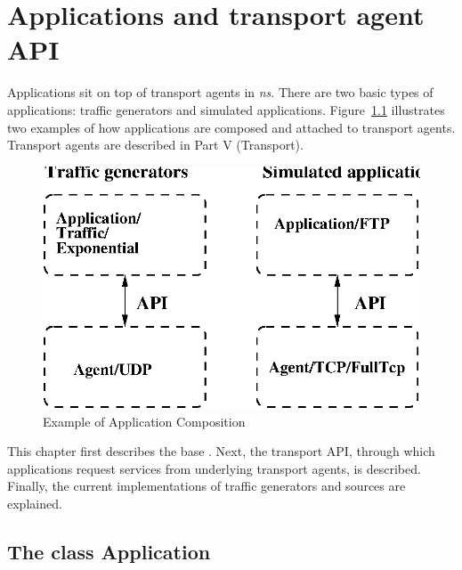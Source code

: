 \chapter{Applications and transport agent API}
\label{chap:applications}

Applications sit on top of transport agents in \emph{ns}.  There are two basic types
of applications:  traffic generators and simulated applications.  
Figure~\ref{fig:application} illustrates two examples of how applications
are composed and attached to transport agents.  Transport agents are described
in Part V (Transport).

\begin{figure}[tb] 
  \centerline{\includegraphics{application}}
  \caption{Example of Application Composition}
  \label{fig:application} 
\end{figure}

This chapter first describes the base . 
Next, the transport API, through which applications request services from
underlying transport agents, is described.  Finally, the current 
implementations of traffic generators and sources are explained.  


\section{The class Application}
\label{sec:appclass}

